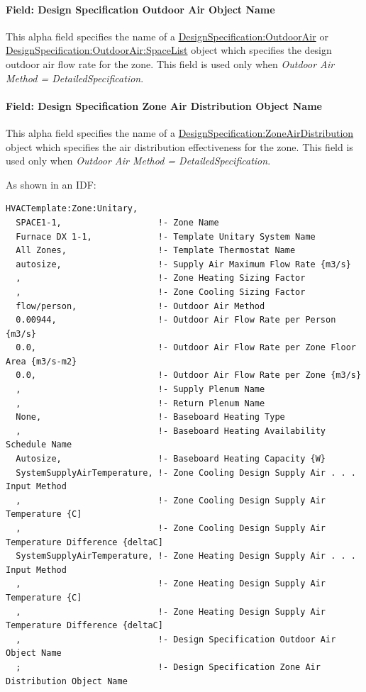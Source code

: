 \paragraph{Field: Design Specification Outdoor Air Object Name}\label{field-design-specification-outdoor-air-object-name-7}

This alpha field specifies the name of a \hyperref[designspecificationoutdoorair]{DesignSpecification:OutdoorAir} or \hyperref[designspecificationoutdoorairspacelist]{DesignSpecification:OutdoorAir:SpaceList} object which specifies the design outdoor air flow rate for the zone. This field is used only when \emph{Outdoor Air Method = DetailedSpecification}.

\paragraph{Field: Design Specification Zone Air Distribution Object Name}\label{field-design-specification-zone-air-distribution-object-name-6}

This alpha field specifies the name of a \hyperref[designspecificationzoneairdistribution]{DesignSpecification:ZoneAirDistribution} object which specifies the air distribution effectiveness for the zone. This field is used only when \emph{Outdoor Air Method = DetailedSpecification}.

As shown in an IDF:

\begin{lstlisting}
HVACTemplate:Zone:Unitary,
  SPACE1-1,                   !- Zone Name
  Furnace DX 1-1,             !- Template Unitary System Name
  All Zones,                  !- Template Thermostat Name
  autosize,                   !- Supply Air Maximum Flow Rate {m3/s}
  ,                           !- Zone Heating Sizing Factor
  ,                           !- Zone Cooling Sizing Factor
  flow/person,                !- Outdoor Air Method
  0.00944,                    !- Outdoor Air Flow Rate per Person {m3/s}
  0.0,                        !- Outdoor Air Flow Rate per Zone Floor Area {m3/s-m2}
  0.0,                        !- Outdoor Air Flow Rate per Zone {m3/s}
  ,                           !- Supply Plenum Name
  ,                           !- Return Plenum Name
  None,                       !- Baseboard Heating Type
  ,                           !- Baseboard Heating Availability Schedule Name
  Autosize,                   !- Baseboard Heating Capacity {W}
  SystemSupplyAirTemperature, !- Zone Cooling Design Supply Air . . . Input Method
  ,                           !- Zone Cooling Design Supply Air Temperature {C]
  ,                           !- Zone Cooling Design Supply Air Temperature Difference {deltaC]
  SystemSupplyAirTemperature, !- Zone Heating Design Supply Air . . . Input Method
  ,                           !- Zone Heating Design Supply Air Temperature {C]
  ,                           !- Zone Heating Design Supply Air Temperature Difference {deltaC]
  ,                           !- Design Specification Outdoor Air Object Name
  ;                           !- Design Specification Zone Air Distribution Object Name
\end{lstlisting}

